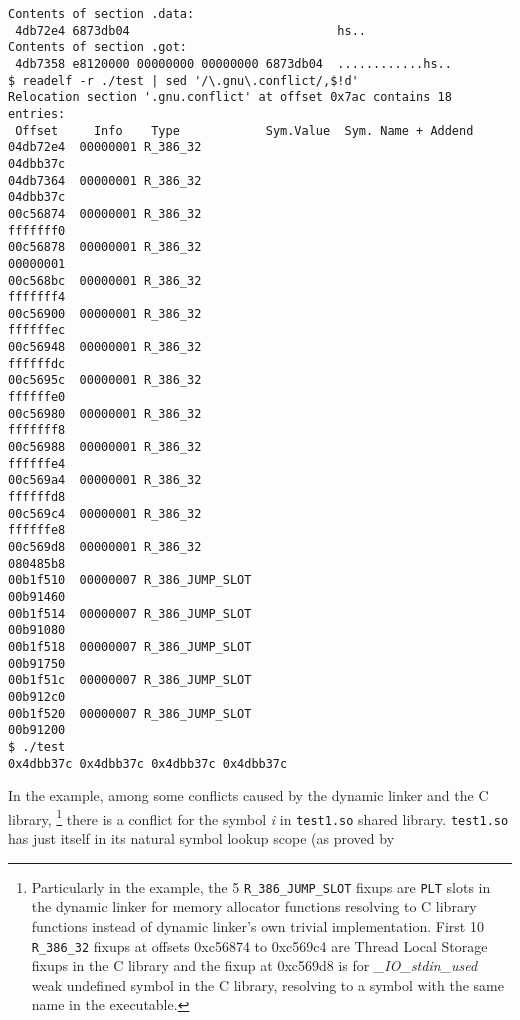 \documentclass[twoside]{article}
\def\tts#1{\texttt{\small #1}}
\begin{document}
{{\begin{verbatim}
Contents of section .data:
 4db72e4 6873db04                             hs..
Contents of section .got:
 4db7358 e8120000 00000000 00000000 6873db04  ............hs..
$ readelf -r ./test | sed '/\.gnu\.conflict/,$!d'
Relocation section '.gnu.conflict' at offset 0x7ac contains 18 entries:
 Offset     Info    Type            Sym.Value  Sym. Name + Addend
04db72e4  00000001 R_386_32                                     04dbb37c
04db7364  00000001 R_386_32                                     04dbb37c
00c56874  00000001 R_386_32                                     fffffff0
00c56878  00000001 R_386_32                                     00000001
00c568bc  00000001 R_386_32                                     fffffff4
00c56900  00000001 R_386_32                                     ffffffec
00c56948  00000001 R_386_32                                     ffffffdc
00c5695c  00000001 R_386_32                                     ffffffe0
00c56980  00000001 R_386_32                                     fffffff8
00c56988  00000001 R_386_32                                     ffffffe4
00c569a4  00000001 R_386_32                                     ffffffd8
00c569c4  00000001 R_386_32                                     ffffffe8
00c569d8  00000001 R_386_32                                     080485b8
00b1f510  00000007 R_386_JUMP_SLOT                              00b91460
00b1f514  00000007 R_386_JUMP_SLOT                              00b91080
00b1f518  00000007 R_386_JUMP_SLOT                              00b91750
00b1f51c  00000007 R_386_JUMP_SLOT                              00b912c0
00b1f520  00000007 R_386_JUMP_SLOT                              00b91200
$ ./test
0x4dbb37c 0x4dbb37c 0x4dbb37c 0x4dbb37c
\end{verbatim}}
}

In the example, among some conflicts caused by the dynamic linker and the C library,
\footnote{Particularly in the example, the 5 \tts{R\_386\_JUMP\_SLOT} fixups
are \tts{PLT} slots in the dynamic linker for memory allocator functions
resolving to C library functions instead of dynamic linker's own trivial
implementation.  First 10 \tts{R\_386\_32} fixups at offsets 0xc56874
to 0xc569c4 are Thread Local Storage fixups in the C library and
the fixup at 0xc569d8 is for {\sl \_IO\_stdin\_used} weak undefined symbol
in the C library, resolving to a symbol with the same name in the executable.}
there is a conflict for the symbol {\sl i} in \tts{test1.so} shared library.
\tts{test1.so} has just itself in its natural symbol lookup scope (as proved
by
\end{document}
